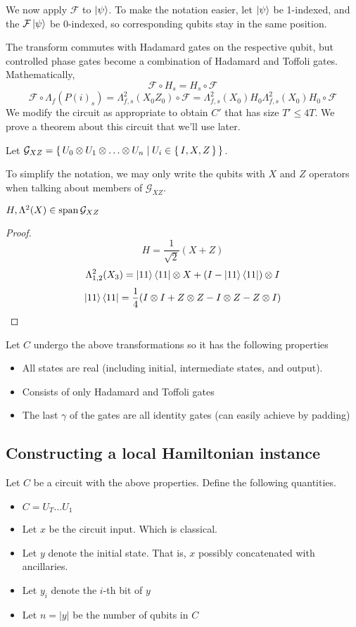 We now apply $\mathcal{F}$ to $\ket\psi$. To make the notation easier, let $\ket{\psi}$ be 1-indexed, and the $\mathcal{F}\ket{\psi}$ be 0-indexed, so corresponding qubits stay in the same position.

The transform commutes with Hadamard gates on the respective qubit, but controlled phase gates become a combination of Hadamard and Toffoli gates. Mathematically,
$$\mathcal{F}\circ H_s=H_s\circ\mathcal{F}$$
$$\mathcal{F}\circ\Lambda_f(P(i)_s)=\Lambda^2_{f,s}(X_0Z_0)\circ\mathcal{F}=\Lambda^2_{f,s}(X_0)H_0\Lambda^2_{f,s}(X_0)H_0\circ\mathcal{F}$$
We modify the circuit as appropriate to obtain $C'$ that has size $T'\leq 4T$. We prove a theorem about this circuit that we'll use later.

\begin{definition}
	Let $\mathcal{G}_{XZ}=\set{U_0\otimes U_1\otimes\ldots\otimes U_n|U_i\in\set{I,X,Z}}$.
\end{definition}

To simplify the notation, we may only write the qubits with $X$ and $Z$ operators when talking about members of $\mathcal{G}_{XZ}$.

\begin{theorem}
	$H,\Lambda^2(X)\in\operatorname*{\operatorname{span}}\mathcal{G}_{XZ}$
\end{theorem}

\begin{proof}
	$$H=\frac{1}{\sqrt{2}}(X+Z)$$
	$$\Lambda^2_{1,2}(X_3)=\ket{11}\bra{11}\otimes X+(I-\ket{11}\bra{11})\otimes I$$
	$$\ket{11}\bra{11}=\frac{1}{4}(I\otimes I+Z\otimes Z-I\otimes Z-Z\otimes I)$$
\end{proof}

Let $C$ undergo the above transformations so it has the following properties
\begin{itemize}
	\item All states are real (including initial, intermediate states, and output).
	\item Consists of only Hadamard and Toffoli gates
	\item The last $\gamma$ of the gates are all identity gates (can easily achieve by padding)
\end{itemize}

\subsection{Constructing a local Hamiltonian instance}

Let $C$ be a circuit with the above properties. Define the following quantities.
\begin{itemize}
	\item $C=U_T\ldots U_1$
	\item Let $x$ be the circuit input. Which is classical.
	\item Let $y$ denote the initial state. That is, $x$ possibly concatenated with ancillaries.
	\item Let $y_i$ denote the $i$-th bit of $y$
	\item Let $n=|y|$ be the number of qubits in $C$
\end{itemize}

